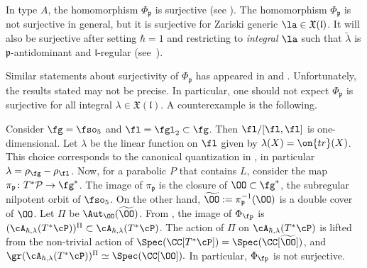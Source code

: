 \documentclass[12pt]{amsart}
\begin{document}
 \begin{rmk}\label{surj_Phi_hbar_nonzero}
In type $A$, the homomorphism  $\Phi_{\mathfrak{p}}$ is surjective (see \cite[Lemma 5.2.1 (5)]{Losev_isofquant}).
The homomorphism $\Phi_{\mathfrak{p}}$ is not surjective in general, but it is surjective for Zariski generic $\la \in \mathfrak{X}(\mathfrak{l})$. 
It will also be surjective after setting $\hbar=1$ and restricting to {\emph{integral}} $\la$ such that $\widetilde{\lambda}$ is $\mathfrak{p}$-antidominant and $\mathfrak{l}$-regular 
(see~\cite[Theorem 3.8]{BoBr}).

Similar statements about surjectivity of $\Phi_{\mathfrak{p}}$ has appeared in \cite[Corollary 3.9]{BoBr} and \cite[Remark 5.2.2]{Losev_isofquant}. Unfortunately, the results stated may not be precise. In particular, one should not expect $\Phi_{\mathfrak{p}}$ is surjective for all integral $\lambda\in \mathfrak{X}(\mathfrak{l})$. A counterexample is the following.

Consider $\fg= \fso_5$ and $\fl= \fgl_2\subset \fg$. Then $\fl/[\fl,\fl]$ is one-dimensional. Let $\lambda$ be the linear function on $\fl$ given by $\lambda(X)= \on{tr}(X)$. This choice corresponds to the canonical quantization in \cite[Section 5.1]{LMBM}, in particular $\lambda=\rho_\fg- \rho_\fl$. Now, for a parabolic  $P$ that contains $L$, consider the map $\pi_{\mathfrak{p}}\colon T^*\mathcal{P} \rightarrow \fg^*$. The image of $\pi_{\mathfrak{p}}$ is the closure of $\OO\subset \fg^*$, the subregular nilpotent orbit of $\fso_5$. On the other hand, $\widetilde{\OO}:= \pi_{\mathfrak{p}}^{-1}(\OO)$ is a double cover of $\OO$. Let $\Pi$ be $\Aut_\OO(\widetilde{\OO})$. From \cite[Corollary 6.5.6]{LMBM}, the image of $\Phi_{\fp}$ is $(\cA_{\hbar, \lambda}(T^*\cP))^{\Pi}\subset \cA_{\hbar, \lambda}(T^*\cP)$. The action of $\Pi$ on $\cA_{\hbar, \lambda}(T^*\cP)$ is lifted from the non-trivial action of $\Spec(\CC[T^*\cP])=\Spec(\CC[\widetilde{\OO}])$, and $\gr (\cA_{\hbar, \lambda}(T^*\cP))^\Pi\simeq \Spec(\CC[\OO]).$ In particular, $\Phi_\fp$ is not surjective. 
 \end{rmk}
\end{document}
